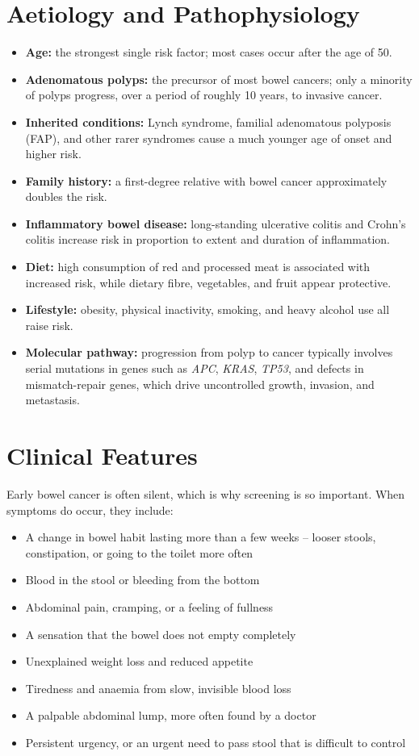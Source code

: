 \section*{Aetiology and Pathophysiology}
\begin{itemize}
    \item \textbf{Age:} the strongest single risk factor; most cases occur after the age of 50.
    \item \textbf{Adenomatous polyps:} the precursor of most bowel cancers; only a minority of polyps progress, over a period of roughly 10 years, to invasive cancer.
    \item \textbf{Inherited conditions:} Lynch syndrome, familial adenomatous polyposis (FAP), and other rarer syndromes cause a much younger age of onset and higher risk.
    \item \textbf{Family history:} a first-degree relative with bowel cancer approximately doubles the risk.
    \item \textbf{Inflammatory bowel disease:} long-standing ulcerative colitis and Crohn's colitis increase risk in proportion to extent and duration of inflammation.
    \item \textbf{Diet:} high consumption of red and processed meat is associated with increased risk, while dietary fibre, vegetables, and fruit appear protective.
    \item \textbf{Lifestyle:} obesity, physical inactivity, smoking, and heavy alcohol use all raise risk.
    \item \textbf{Molecular pathway:} progression from polyp to cancer typically involves serial mutations in genes such as \textit{APC}, \textit{KRAS}, \textit{TP53}, and defects in mismatch-repair genes, which drive uncontrolled growth, invasion, and metastasis.
\end{itemize}

\section*{Clinical Features}
Early bowel cancer is often silent, which is why screening is so important. When symptoms do occur, they include:
\begin{itemize}
    \item A change in bowel habit lasting more than a few weeks -- looser stools, constipation, or going to the toilet more often
    \item Blood in the stool or bleeding from the bottom
    \item Abdominal pain, cramping, or a feeling of fullness
    \item A sensation that the bowel does not empty completely
    \item Unexplained weight loss and reduced appetite
    \item Tiredness and anaemia from slow, invisible blood loss
    \item A palpable abdominal lump, more often found by a doctor
    \item Persistent urgency, or an urgent need to pass stool that is difficult to control
\end{itemize}

